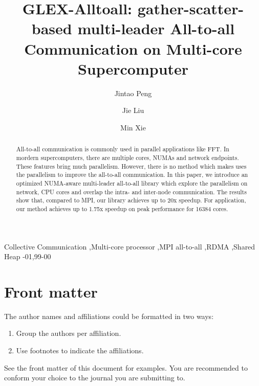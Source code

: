 \documentclass[5p,times]{elsarticle}
\begin{document}
\begin{frontmatter}

\title{GLEX-Alltoall: gather-scatter-based multi-leader All-to-all Communication on Multi-core Supercomputer}

\author{Jintao Peng}
\author{Jie Liu}
\author{Min Xie}

\address{Changsha, China}



\begin{abstract}
		All-to-all communication is commonly used in parallel applications like FFT. 
		In mordern supercomputers, there are multiple cores, NUMAs and network endpoints. 
		These features bring much parallelism. 
		However, there is no method which makes uses the parallelism to improve the all-to-all communication. 
		In this paper, we introduce an optimized NUMA-aware multi-leader all-to-all library which explore the parallelism on network, CPU cores and overlap the intra- and inter-node communication. 
		The results show that, compared to MPI, our library achieves up to 20x speedup. 
		For application, our method achieves up to 1.75x speedup on peak performance for 16384 cores.
\end{abstract}

\begin{keyword}
 Collective Communication \sep Multi-core processor \sep MPI all-to-all \sep RDMA \sep Shared Heap
-01\sep  99-00
\end{keyword}

\end{frontmatter}

\linenumbers





\section{Front matter}

The author names and affiliations could be formatted in two ways:
\begin{enumerate}[(1)]
\item Group the authors per affiliation.
\item Use footnotes to indicate the affiliations.
\end{enumerate}
See the front matter of this document for examples. You are recommended to conform your choice to the journal you are submitting to.
\end{document}
